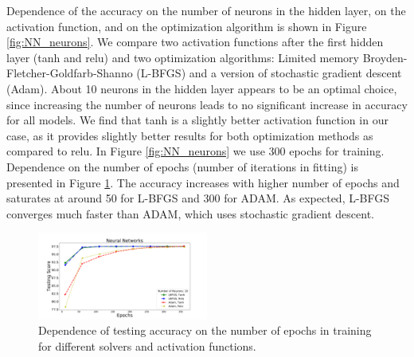 Dependence of the accuracy on the number of neurons in the hidden layer, on the activation function, 
and on the optimization algorithm is shown in Figure \ref{fig:NN_neurons}. 
We compare two activation functions after the first hidden layer (tanh and relu) and two optimization algorithms: Limited memory Broyden-Fletcher-Goldfarb-Shanno (L-BFGS) and a version of stochastic gradient descent (Adam). 
About 10 neurons in the hidden layer appears to be an optimal choice, since increasing the number of neurons leads to no significant increase in accuracy for all models. 
We find that tanh is a slightly better activation function in our case, as it provides slightly better results for both optimization methods as compared to relu.
In Figure \ref{fig:NN_neurons} we use 300 epochs for training.
Dependence on the number of epochs (number of iterations in fitting) is presented in Figure \ref{fig:NN_epochs}. 
The accuracy increases with higher number of epochs and saturates at around 50 for L-BFGS and 300 for ADAM. As expected, L-BFGS converges much faster than ADAM, which uses stochastic gradient descent.



\begin{figure}[h]
\hspace*{-0.5cm}
\includegraphics[width=0.5\textwidth]{plots/nn_epochs.pdf}
\caption{
Dependence of testing accuracy on the number of epochs in training for different solvers and activation functions.
}
\label{fig:NN_epochs}
\end{figure}





